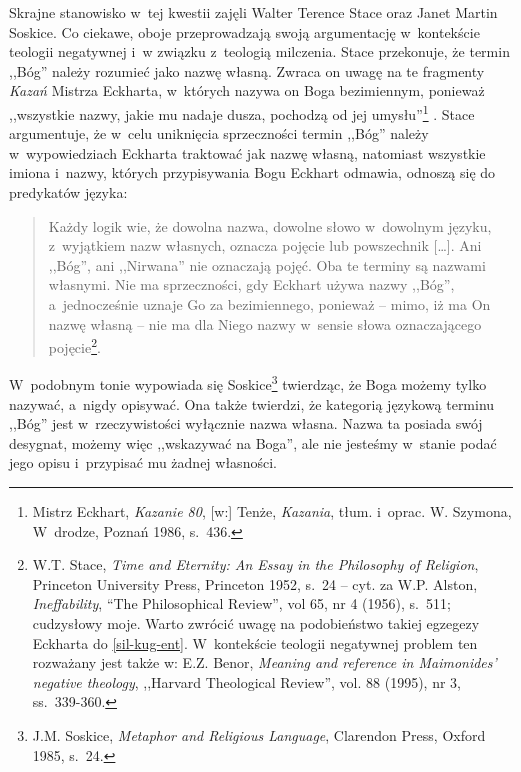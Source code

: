 Skrajne stanowisko w~tej kwestii zajęli Walter Terence Stace oraz Janet Martin Soskice. Co ciekawe, oboje przeprowadzają swoją argumentację w~kontekście teologii negatywnej i~w związku z~teologią milczenia. Stace przekonuje, że termin ,,Bóg'' należy rozumieć jako nazwę własną. Zwraca on uwagę na te fragmenty \textit{Kazań} Mistrza Eckharta, w~których nazywa on Boga bezimiennym, ponieważ ,,wszystkie nazwy, jakie mu nadaje dusza, pochodzą od jej umysłu''\footnote{Mistrz Eckhart, \textit{Kazanie 80}, [w:] Tenże, \textit{Kazania}, tłum. i~oprac. W. Szymona, W~drodze, Poznań 1986, s.~436.} . Stace argumentuje, że w~celu uniknięcia sprzeczności termin ,,Bóg'' należy w~wypowiedziach Eckharta traktować jak nazwę własną, natomiast wszystkie imiona i~nazwy, których przypisywania Bogu Eckhart odmawia, odnoszą się do predykatów języka:

\begin{quote}
Każdy logik wie, że dowolna nazwa, dowolne słowo w~dowolnym języku, z~wyjątkiem nazw własnych, oznacza pojęcie lub powszechnik [\ldots]. Ani ,,Bóg'', ani ,,Nirwana'' nie oznaczają pojęć. Oba te terminy są nazwami własnymi. Nie ma sprzeczności, gdy Eckhart używa nazwy ,,Bóg'', a~jednocześnie uznaje Go za bezimiennego, ponieważ -- mimo, iż ma On nazwę własną -- nie ma dla Niego nazwy w~sensie słowa oznaczającego pojęcie\footnote{W.T. Stace, \textit{Time and Eternity: An Essay in the Philosophy of Religion}, Princeton University Press, Princeton 1952, s.~24 -- cyt. za W.P. Alston, \textit{Ineffability}, ``The Philosophical Review'', vol 65, nr 4 (1956), s.~511; cudzysłowy moje. Warto zwrócić uwagę na podobieństwo takiej egzegezy Eckharta do \ref{sil-kug-ent}. W~kontekście teologii negatywnej problem ten rozważany jest także w: E.Z. Benor, \textit{Meaning and reference in Maimonides' negative theology}, ,,Harvard Theological Review'', vol. 88 (1995), nr 3, ss.~339-360.}.
\end{quote}

W~podobnym tonie wypowiada się Soskice\footnote{J.M. Soskice, \textit{Metaphor and Religious Language}, Clarendon Press, Oxford 1985, s.~24.} twierdząc, że Boga możemy tylko nazywać, a~nigdy opisywać. Ona także twierdzi, że kategorią językową terminu ,,Bóg'' jest w~rzeczywistości wyłącznie nazwa własna. Nazwa ta posiada swój desygnat, możemy więc ,,wskazywać na Boga'', ale nie jesteśmy w~stanie podać jego opisu i~przypisać mu żadnej własności.

